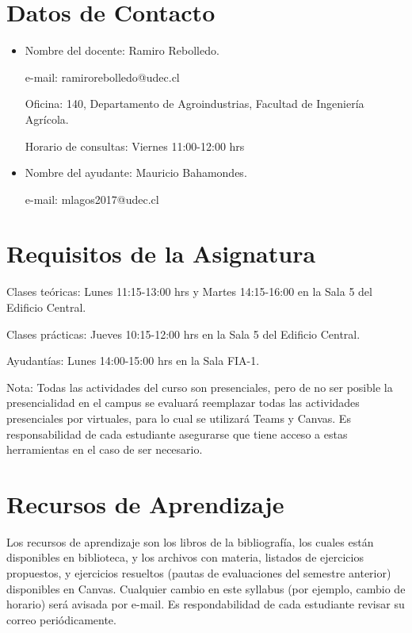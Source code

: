 \documentclass[11pt]{article}
\begin{document}
\section{Datos de Contacto}
\label{sec:orgceb8c24}

\begin{itemize}
\item Nombre del docente: Ramiro Rebolledo.

e-mail: ramirorebolledo@udec.cl

Oficina: 140, Departamento de Agroindustrias, Facultad de Ingeniería Agrícola.  

Horario de consultas: Viernes 11:00-12:00 hrs

\item Nombre del ayudante: Mauricio Bahamondes.

e-mail: mlagos2017@udec.cl
\end{itemize}


\section{Requisitos de la Asignatura}
\label{sec:org711556d}

Clases teóricas: Lunes 11:15-13:00 hrs y Martes 14:15-16:00 en la Sala 5 del Edificio Central.

Clases prácticas: Jueves 10:15-12:00 hrs en la Sala 5 del Edificio Central.

Ayudantías: Lunes 14:00-15:00 hrs en la Sala FIA-1.

Nota: Todas las actividades del curso son presenciales, pero de no ser posible la presencialidad en el campus se evaluará reemplazar todas las actividades presenciales por virtuales, para lo cual se utilizará Teams y Canvas. Es responsabilidad de cada estudiante asegurarse que tiene acceso a estas herramientas  en el caso de ser necesario.


\section{Recursos de Aprendizaje}
\label{sec:org0f70fec}
Los recursos de aprendizaje son los libros de la bibliografía, los cuales están disponibles en biblioteca, y los archivos con materia, listados de ejercicios propuestos, y ejercicios resueltos (pautas de evaluaciones del semestre anterior) disponibles en Canvas. Cualquier cambio en este syllabus (por ejemplo, cambio de horario) será avisada por e-mail. Es respondabilidad de cada estudiante revisar su correo periódicamente.
\end{document}
